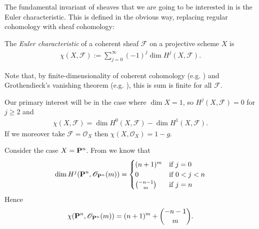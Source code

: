 \documentclass[12pt]{ociamthesis}  %
\begin{document}
The fundamental invariant of sheaves that we are going
to be interested in is the Euler characteristic. This is defined
in the obvious way, replacing regular cohomology with sheaf
cohomology:

\begin{definition}
  The \emph{Euler characteristic} of a coherent sheaf $\mathscr F$
  on a projective scheme $X$ is
  \begin{align*}
    \chi (X,\mathscr F) := \sum_{j=0}^\infty (-1)^j \dim H^j (X,\mathscr F).
  \end{align*}
\end{definition}

Note that, by finite-dimensionality of coherent cohomology
(e.g. \cite[\href{https://stacks.math.columbia.edu/tag/02O6}{Tag 02O6}]{stacks-project}) and Grothendieck's vanishing theorem (e.g.
\cite[III Theorem 2.7]{hartshorne1977}), this is sum is finite for
all $\mathscr F$.

\begin{example}
  Our primary interest will be in the case where
  $\dim X = 1$, so $H^j(X,\mathscr F)=0$ for $j\geq 2$ and
  \begin{align*}
    \chi (X,\mathscr F) = \dim H^0(X,\mathscr F)-\dim H^1(X,\mathscr F).
  \end{align*}
  If we moreover take $\mathscr F=\mathscr O_X$ then
  $\chi (X,\mathscr O_X) = 1 - g$. 
\end{example}

\begin{example}
  Consider the case $X=\mathbf{P}^{n}_{}$.
  From \missingcitation we know that
  \begin{align*}
    \dim H^j(\mathbf{P}^{n}_{},\mathscr O_{\mathbf{P}^{n}_{}}(m)) =
    \begin{cases}
      (n+1)^m         & \text{if }j = 0 \\
      0               & \text{if }0<j<n \\
      \binom{-n-1}{m} & \text{if }j=n
    \end{cases}
  \end{align*}
  Hence 
  \begin{align*}
    \chi(\mathbf{P}^{n}_{},\mathscr O_{\mathbf{P}^{n}_{}}(m))
    = (n+1)^m + \binom{-n-1}{m}.
  \end{align*}
\end{example}
\end{document}
